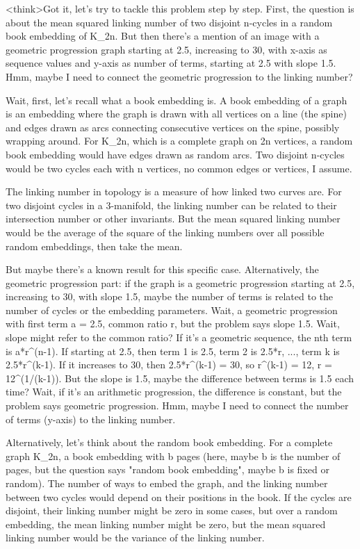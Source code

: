 <think>Got it, let's try to tackle this problem step by step. First, the question is about the mean squared linking number of two disjoint n-cycles in a random book embedding of K_{2n}. But then there's a mention of an image with a geometric progression graph starting at 2.5, increasing to 30, with x-axis as sequence values and y-axis as number of terms, starting at 2.5 with slope 1.5. Hmm, maybe I need to connect the geometric progression to the linking number?

Wait, first, let's recall what a book embedding is. A book embedding of a graph is an embedding where the graph is drawn with all vertices on a line (the spine) and edges drawn as arcs connecting consecutive vertices on the spine, possibly wrapping around. For K_{2n}, which is a complete graph on 2n vertices, a random book embedding would have edges drawn as random arcs. Two disjoint n-cycles would be two cycles each with n vertices, no common edges or vertices, I assume.

The linking number in topology is a measure of how linked two curves are. For two disjoint cycles in a 3-manifold, the linking number can be related to their intersection number or other invariants. But the mean squared linking number would be the average of the square of the linking numbers over all possible random embeddings, then take the mean.

But maybe there's a known result for this specific case. Alternatively, the geometric progression part: if the graph is a geometric progression starting at 2.5, increasing to 30, with slope 1.5, maybe the number of terms is related to the number of cycles or the embedding parameters. Wait, a geometric progression with first term a = 2.5, common ratio r, but the problem says slope 1.5. Wait, slope might refer to the common ratio? If it's a geometric sequence, the nth term is a*r^(n-1). If starting at 2.5, then term 1 is 2.5, term 2 is 2.5*r, ..., term k is 2.5*r^(k-1). If it increases to 30, then 2.5*r^(k-1) = 30, so r^(k-1) = 12, r = 12^(1/(k-1)). But the slope is 1.5, maybe the difference between terms is 1.5 each time? Wait, if it's an arithmetic progression, the difference is constant, but the problem says geometric progression. Hmm, maybe I need to connect the number of terms (y-axis) to the linking number.

Alternatively, let's think about the random book embedding. For a complete graph K_{2n}, a book embedding with b pages (here, maybe b is the number of pages, but the question says "random book embedding", maybe b is fixed or random). The number of ways to embed the graph, and the linking number between two cycles would depend on their positions in the book. If the cycles are disjoint, their linking number might be zero in some cases, but over a random embedding, the mean linking number might be zero, but the mean squared linking number would be the variance of the linking number.


